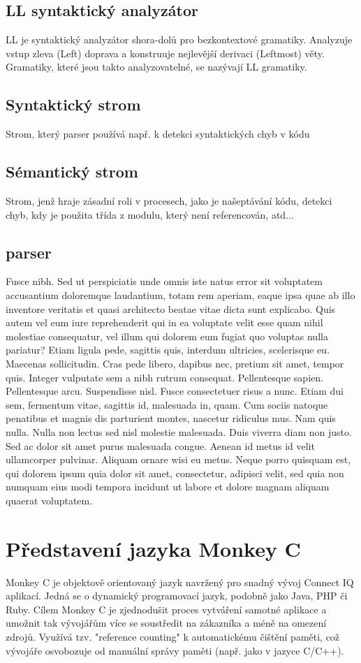 \documentclass[czech,master,dept460,male,cpp,cpdeclaration]{diploma}
\begin{document}
\subsection{LL syntaktický analyzátor}
LL je syntaktický analyzátor shora-dolů pro bezkontextové gramatiky. Analyzuje vstup zleva (Left) doprava a konstruuje nejlevější derivaci (Leftmost) věty. Gramatiky, které jsou takto analyzovatelné, se nazývají LL gramatiky.

\subsection{Syntaktický strom}
Strom, který parser používá např. k detekci syntaktických chyb v kódu
\subsection{Sémantický strom}
Strom, jenž hraje zásadní roli v procesech, jako je našeptávání kódu, detekci chyb, kdy je použita třída z modulu, který není referencován, atd...
\subsection{parser}
Fusce nibh. Sed ut perspiciatis unde omnis iste natus error sit voluptatem accusantium doloremque laudantium, totam rem aperiam, eaque ipsa quae ab illo inventore veritatis et quasi architecto 
beatae vitae dicta sunt explicabo. Quis autem vel eum iure reprehenderit qui in ea voluptate velit esse quam nihil molestiae consequatur, vel illum qui dolorem eum fugiat quo voluptas nulla pariatur? Etiam ligula pede, sagittis quis, interdum ultricies, scelerisque eu. Maecenas sollicitudin. Cras pede libero, dapibus nec, pretium sit amet, tempor quis. Integer vulputate sem a nibh rutrum consequat. Pellentesque sapien. Pellentesque arcu. Suspendisse nisl. Fusce consectetuer risus a nunc. Etiam dui sem, fermentum vitae, sagittis id, malesuada in, quam. Cum sociis natoque penatibus et magnis dis parturient montes, nascetur ridiculus mus. Nam quis nulla. Nulla non lectus sed nisl molestie malesuada. Duis viverra diam non justo. Sed ac dolor sit amet purus malesuada congue. Aenean id metus id velit ullamcorper pulvinar. Aliquam ornare wisi eu metus. Neque porro quisquam est, qui dolorem ipsum quia dolor sit amet, consectetur, adipisci velit, sed quia non numquam eius modi tempora incidunt ut labore et dolore magnam aliquam quaerat voluptatem.




\section{Představení jazyka Monkey C}
Monkey C je objektově orientovaný jazyk navržený pro snadný vývoj Connect IQ aplikací. Jedná se o dynamický programovací jazyk, podobně jako Java, PHP či Ruby. Cílem Monkey C je zjednodušit proces vytváření samotné aplikace a umožnit tak vývojářům více se soustředit na zákazníka a méně na omezení zdrojů. Využívá tzv. "reference counting" k automatickému čištění paměti, což vývojáře osvobozuje od manuální správy paměti (např. jako v jazyce C/C++).
   
\end{document}
